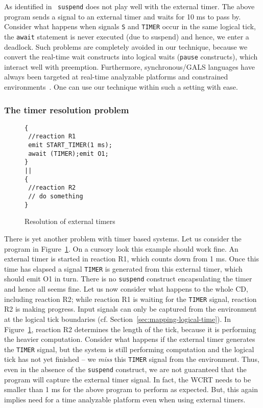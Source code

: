 As identified in~\cite{Bourke2009a} \texttt{suspend} does not play well
with the external timer. The above program sends a signal to an external
timer and waits for 10 ms to pass by. Consider what happens when signals
\texttt{S} and \texttt{TIMER} occur in the same logical tick, the
\texttt{await} statement is never executed (due to suspend) and hence,
we enter a deadlock. Such problems are completely avoided in our
technique, because we convert the real-time wait constructs into logical
waits (\texttt{pause} constructs), which interact well with preemption.
Furthermore, synchronous/GALS languages have always been targeted at
real-time analyzable platforms and constrained
environments~\cite{DBLP:journals/pieee/SifakisTY03,boldt07}. One can use
our technique within such a setting with ease.

\subsubsection{The timer resolution problem}
\label{sec:resolution-real-time}

\begin{figure}[h!]
  \centering
	\vspace{-10pt}
		\begin{lstlisting}[style=sysj,basicstyle=\normalsize\ttfamily,morekeywords={emit,trap,pause,exit,delay,suspend}]
{
 //reaction R1
 emit START_TIMER(1 ms); 
 await (TIMER);emit O1;
}
||
{
 //reaction R2
 // do something
}
		\end{lstlisting}
  \caption{Resolution of external timers}
  \label{fig:resolution}
	\vspace{-10pt}
\end{figure}

There is yet another problem with timer based systems. Let us consider
the program in Figure~\ref{fig:resolution}. On a cursory look this
example should work fine. An external timer is started in reaction R1,
which counts down from 1 ms. Once this time has elapsed a signal
\texttt{TIMER} is generated from this external timer, which should emit
O1 in turn. There is no \texttt{suspend} construct encapsulating the
timer and hence all seems fine. Let us now consider what happens to the
whole CD, including reaction R2; while reaction R1 is waiting for the
\texttt{TIMER} signal, reaction R2 is making progress. Input signals can
only be captured from the environment at the logical tick boundaries
(cf. Section~\ref{sec:mapping-logical-time}). In
Figure~\ref{fig:resolution}, reaction R2 determines the length of the
tick, because it is performing the heavier computation. Consider what
happens if the external timer generates the \texttt{TIMER} signal, but
the system is still performing computation and the logical tick has not
yet finished -- we \textit{miss} this \texttt{TIMER} signal from the
environment. Thus, even in the absence of the \texttt{suspend}
construct, we are not guaranteed that the program will capture the
external timer signal. In fact, the WCRT needs to be smaller than 1 ms
for the above program to perform as expected. But, this again implies
need for a time analyzable platform even when using external timers.

